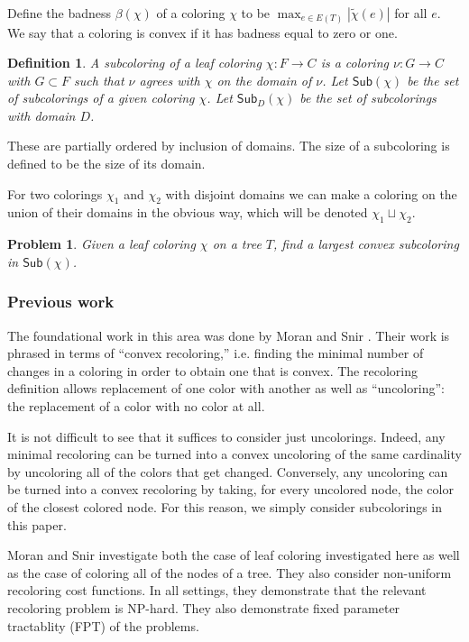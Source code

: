 \documentclass{amsart}
\newcommand{\col}{\chi}
\newcommand{\colt}{\tilde{\chi}}
\newcommand{\subcolS}{\mathsf{Sub}}
\newcommand{\bad}{\beta}
\newtheorem{problem}{Problem}
\newtheorem{defn}{Definition}
\begin{document}
Define the badness $\bad(\col)$ of a coloring $\col$ to be $\max_{e \in E(T)} |\colt(e)| $ for all $e$.
We say that a coloring is convex if it has badness equal to zero or one.

\begin{defn}
  A subcoloring of a leaf coloring $\chi: F \rightarrow C$ is a coloring $\nu: G \rightarrow C$ with $G \subset F$ such that $\nu$ agrees with $\col$ on the domain of $\nu$.
  Let $\subcolS(\col)$ be the set of subcolorings of a given coloring $\col$.
  Let $\subcolS_D(\col)$ be the set of subcolorings with domain $D$.
\end{defn}
These are partially ordered by inclusion of domains.
The size of a subcoloring is defined to be the size of its domain.

For two colorings $\col_1$ and $\col_2$ with disjoint domains we can make a coloring on the union of their domains in the obvious way, which will be denoted $\col_1 \sqcup \col_2$.

\begin{problem}
\label{prob:subcolor}
  Given a leaf coloring $\col$ on a tree $T$, find a largest convex subcoloring in $\subcolS(\col)$.
\end{problem}

\subsubsection{Previous work}
The foundational work in this area was done by Moran and Snir \cite{MoranSnirConvexApprox07,MoranSnirConvexHard08}.
Their work is phrased in terms of ``convex recoloring,'' i.e. finding the minimal number of changes in a coloring in order to obtain one that is convex.
The recoloring definition allows replacement of one color with another as well as ``uncoloring'': the replacement of a color with no color at all.

It is not difficult to see that it suffices to consider just uncolorings.
Indeed, any minimal recoloring can be turned into a convex uncoloring of the same cardinality by uncoloring all of the colors that get changed.
Conversely, any uncoloring can be turned into a convex recoloring by taking, for every uncolored node, the color of the closest colored node.
For this reason, we simply consider subcolorings in this paper.

Moran and Snir investigate both the case of leaf coloring investigated here as well as the case of coloring all of the nodes of a tree.
They also consider non-uniform recoloring cost functions.
In all settings, they demonstrate that the relevant recoloring problem is NP-hard.
They also demonstrate fixed parameter tractablity (FPT) of the problems.
\end{document}

